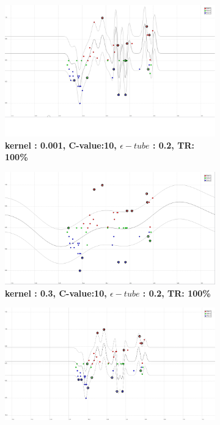 \begin{figure}[!ht]
\centering
\begin{subfigure}[h]{0.3\textwidth}
\centering
\includegraphics[height=0.11\textheight]{./regression/RBF_0_001_10_0_2_100.png}
\caption{\bf kernel : 0.001, C-value:10, $\epsilon-tube$ : 0.2, TR: 100\%}
\label{fig_RBF_0_001_10_0_2_100}
\end{subfigure}
\begin{subfigure}[h]{0.3\textwidth}
\centering
\includegraphics[height=0.11\textheight]{./regression/RBF_0_3_10_0_2_100.png}
\caption{\bf kernel : 0.3, C-value:10, $\epsilon-tube$ : 0.2, TR: 100\%}
\label{fig_RBF_0_3_10_0_2_100}
\end{subfigure}
\begin{subfigure}[h]{0.3\textwidth}
\centering
\includegraphics[height=0.11\textheight]{./regression/RBF_0_3_1_5_0_2_100.png}

\end{subfigure}
\end{figure}

